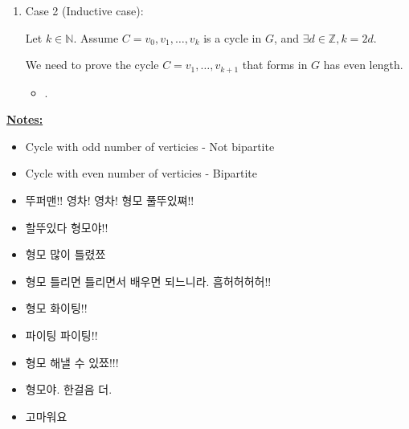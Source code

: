 \documentclass[12pt]{article}
\begin{document}
\begin{enumerate}[a.]
\begin{mdframed}
\begin{enumerate}[1.]
            \item Case 2 (Inductive case):

            \bigskip

            Let $k \in \mathbb{N}$. Assume $C=v_0,v_1,\dots,v_k$ is a cycle
            in $G$, and $\exists d \in \mathbb{Z}, k = 2d$.

            \bigskip

            We need to prove the cycle $C = v_1,\dots,v_{k+1}$ that forms in $G$
            has even length.

            \bigskip

            \begin{itemize}
                \item .
            \end{itemize}
        \end{enumerate}
    \end{mdframed}

    \underline{\textbf{Notes:}}

    \begin{itemize}
        \item Cycle with odd number of verticies - Not bipartite


        \item Cycle with even number of verticies - Bipartite


        \item 뚜퍼맨!! 영차! 영차! 형모 풀뚜있쪄!!
        \item 할뚜있다 형모야!!
        \item 형모 많이 틀렸쬬
        \item 형모 틀리면 틀리면서 배우면 되느니라. 흠허허허허!!
        \item 형모 화이팅!!
        \item 파이팅 파이팅!!
        \item 형모 해낼 수 있쬬!!!
        \item 형모야. 한걸음 더.
        \item 고마워요

    \end{itemize}

\end{enumerate}
\end{document}
